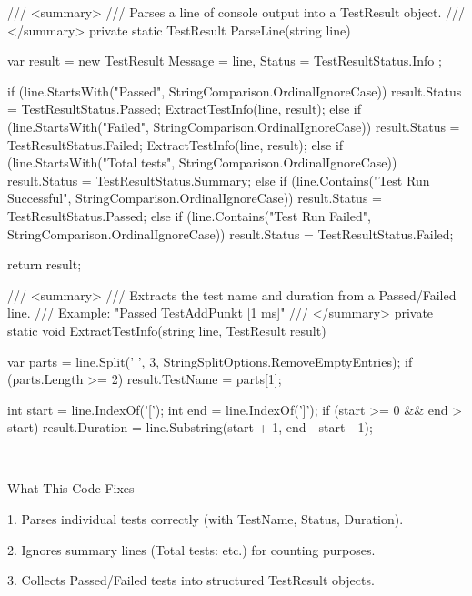 {{        /// <summary>
        /// Parses a line of console output into a TestResult object.
        /// </summary>
        private static TestResult ParseLine(string line)
        {
            var result = new TestResult
            {
                Message = line,
                Status = TestResultStatus.Info
            };

            if (line.StartsWith("Passed", StringComparison.OrdinalIgnoreCase))
            {
                result.Status = TestResultStatus.Passed;
                ExtractTestInfo(line, result);
            }
            else if (line.StartsWith("Failed", StringComparison.OrdinalIgnoreCase))
            {
                result.Status = TestResultStatus.Failed;
                ExtractTestInfo(line, result);
            }
            else if (line.StartsWith("Total tests", StringComparison.OrdinalIgnoreCase))
            {
                result.Status = TestResultStatus.Summary;
            }
            else if (line.Contains("Test Run Successful", StringComparison.OrdinalIgnoreCase))
            {
                result.Status = TestResultStatus.Passed;
            }
            else if (line.Contains("Test Run Failed", StringComparison.OrdinalIgnoreCase))
            {
                result.Status = TestResultStatus.Failed;
            }

            return result;
        }

        /// <summary>
        /// Extracts the test name and duration from a Passed/Failed line.
        /// Example: "Passed TestAddPunkt [1 ms]"
        /// </summary>
        private static void ExtractTestInfo(string line, TestResult result)
        {
            var parts = line.Split(' ', 3, StringSplitOptions.RemoveEmptyEntries);
            if (parts.Length >= 2)
                result.TestName = parts[1];

            int start = line.IndexOf('[');
            int end = line.IndexOf(']');
            if (start >= 0 && end > start)
                result.Duration = line.Substring(start + 1, end - start - 1);
        }
    }
}


---

What This Code Fixes

1. Parses individual tests correctly (with TestName, Status, Duration).


2. Ignores summary lines (Total tests: etc.) for counting purposes.


3. Collects Passed/Failed tests into structured TestResult objects.


